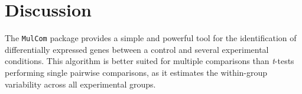 \documentclass[a4paper]{article}
\begin{document}
\section{Discussion}
The \texttt{MulCom} package provides a simple and powerful tool for the
identification of differentially expressed genes between a control and
several experimental conditions. This algorithm is better
suited for multiple comparisons than \emph{t}-tests performing
single pairwise comparisons, as it estimates the
within-group variability across all experimental groups.
\end{document}
